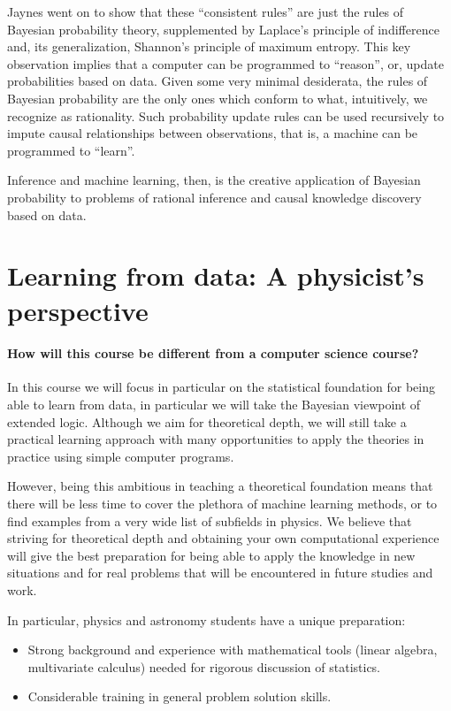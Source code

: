 \documentclass[%
oneside,                 %
final,                   %
10pt]{article}
\newenvironment{summary_mdfboxadmon}[1][]{
\begin{summary_mdfboxmdframed}[frametitle=#1]
}
{
\end{summary_mdfboxmdframed}
}
\begin{document}
Jaynes went on to show that these ``consistent rules'' are just the rules of Bayesian probability theory, supplemented by Laplace's principle of indifference and, its generalization, Shannon's principle of maximum entropy. This key observation implies that a computer can be programmed to ``reason'', or, update probabilities based on data. Given some very minimal desiderata, the rules of Bayesian probability are the only ones which conform to what, intuitively, we recognize as rationality. Such probability update rules can be used recursively to impute causal relationships between observations, that is, a machine can be programmed to ``learn''.


\begin{summary_mdfboxadmon}[Summary]
Inference and machine learning, then, is the creative application of
Bayesian probability to problems of rational inference and causal
knowledge discovery based on data.
\end{summary_mdfboxadmon} %



\section{Learning from data: A physicist's perspective}
\paragraph{How will this course be different from a computer science course?}
In this course we will focus in particular on the statistical foundation for being able to learn from data, in particular we will take the Bayesian viewpoint of extended logic. Although we aim for theoretical depth, we will still take a practical learning approach with many opportunities to apply the theories in practice using simple computer programs. 

However, being this ambitious in teaching a theoretical foundation means that there will be less time to cover the plethora of machine learning methods, or to find examples from a very wide list of subfields in physics. We believe that striving for theoretical depth and obtaining your own computational experience will give the best preparation for being able to apply the knowledge in new situations and for real problems that will be encountered in future studies and work. 

In particular, physics and astronomy students have a unique preparation:
\begin{itemize}
\item Strong background and experience with mathematical tools (linear algebra, multivariate calculus) needed for rigorous discussion of statistics.

\item Considerable training in general problem solution skills.
\end{itemize}
\end{document}
